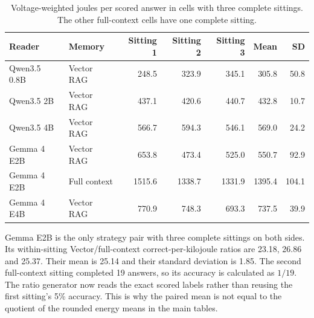 \begin{table}[htbp]
  \centering
  \small
  \setlength{\tabcolsep}{4pt}
  \begin{tabular}{llrrrrr}
    \toprule
    Reader & Memory & Sitting 1 & Sitting 2 & Sitting 3 & Mean & SD \\
    \midrule
    Qwen3.5 0.8B & Vector RAG   & 248.5 & 323.9 & 345.1 & 305.8 & 50.8 \\
    Qwen3.5 2B   & Vector RAG   & 437.1 & 420.6 & 440.7 & 432.8 & 10.7 \\
    Qwen3.5 4B   & Vector RAG   & 566.7 & 594.3 & 546.1 & 569.0 & 24.2 \\
    Gemma 4 E2B  & Vector RAG   & 653.8 & 473.4 & 525.0 & 550.7 & 92.9 \\
    Gemma 4 E2B  & Full context & 1515.6 & 1338.7 & 1331.9 & 1395.4 & 104.1 \\
    Gemma 4 E4B  & Vector RAG   & 770.9 & 748.3 & 693.3 & 737.5 & 39.9 \\
    \bottomrule
  \end{tabular}
  \caption{Voltage-weighted joules per scored answer in cells with three complete
  sittings. The other full-context cells have one complete sitting.}
  \label{tab:app_ch5_energy_replicates}
\end{table}

Gemma E2B is the only strategy pair with three complete sittings on both sides. Its
within-sitting Vector/full-context correct-per-kilojoule ratios are 23.18, 26.86 and
25.37. Their mean is 25.14 and their standard deviation is 1.85. The second
full-context sitting completed 19 answers, so its accuracy is calculated as $1/19$.
The ratio generator now reads the exact scored labels rather than reusing the first
sitting's 5\% accuracy. This is why the paired mean is not equal to the quotient of the
rounded energy means in the main tables.

